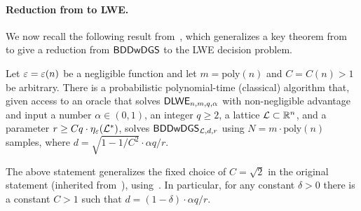 \documentclass{iacrcc}
\begin{document}




\paragraph{Reduction from \BDDwDGS to LWE.}

We now recall the following result from~\cite{STOC:PeiRegSte17},
which generalizes a key theorem from~\cite{Reg09} to give a reduction
from $\mathsf{BDDwDGS}$ to the LWE decision problem.

\begin{theorem}
  \label{thm:bddwdgs-to-dlwe}
  Let $\varepsilon = \varepsilon(n)$ be a negligible function and let
  $m=\text{poly}(n)$ and $C=C(n) > 1$ be arbitrary.  There is a
  probabilistic polynomial-time (classical) algorithm that, given
  access to an oracle that solves $\textsf{\upshape\mdseries DLWE}_{n,m,q,\alpha}$ with
  non-negligible advantage and input a number $\alpha \in (0,1)$, an
  integer $q \geq 2$, a lattice $\mathcal{L} \subset \mathbb{R}^{n}$, and a
  parameter $r \geq C q \cdot \eta_{\varepsilon}(\mathcal{L}^{*})$, solves
  $\mathsf{BDDwDGS}_{\mathcal{L},d,r}$ using $N=m \cdot \text{poly}(n)$ samples,
  where $d = \sqrt{1-1/C^{2}} \cdot \alpha q/r$.
\end{theorem}

\begin{remark}
  \label{rem:PRS-generalized}
  The above statement generalizes the fixed choice of $C=\sqrt{2}$ in
  the original statement (inherited from~\cite[Section~3.2.1]{Reg09}),
  using~\cite[Corollary~3.10]{Reg09}. In particular, for any constant
  $\delta > 0$ there is a constant $C > 1$ such that
  $d = (1-\delta) \cdot \alpha q / r$.
\end{remark}
\end{document}
